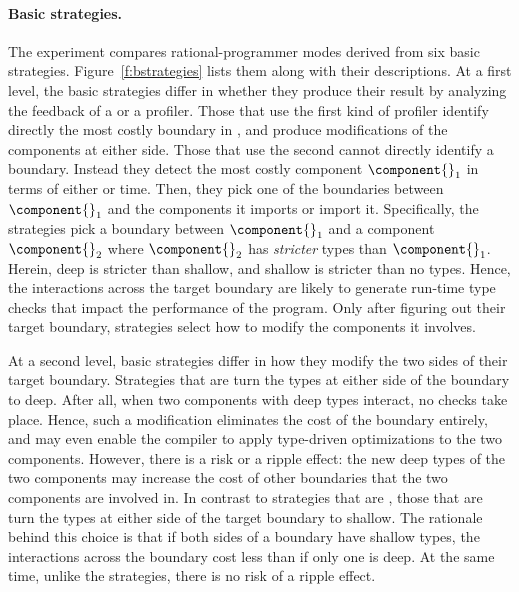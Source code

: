 \paragraph{Basic strategies.}  The experiment compares rational-programmer modes
derived from six basic strategies. Figure~\ref{f:bstrategies} lists them along
with their descriptions.
 At a first level, the basic strategies differ in whether they produce their
 result by analyzing the feedback of a \featkw{} or a \statkw{} profiler.  Those
 that use the first kind of profiler identify directly the most costly boundary
 in \program{}, and produce modifications of the components at either side.
 Those that use the second cannot directly identify a boundary.  Instead they
 detect the most costly component $\component{}_1$ in terms of either \selfkw{}
 or \totalkw{} time.  Then, they pick one of the boundaries between
 $\component{}_1$ and the components it imports or import it.  Specifically, the
 strategies pick a boundary between $\component{}_1$ and a component
 $\component{}_2$ where $\component{}_2$ has \emph{stricter} types than
 $\component{}_1$. Herein, deep is stricter than shallow, and shallow is
 stricter than no types.  Hence, the interactions across the target boundary are
 likely to generate run-time type checks that impact the performance of the
 program.  Only after figuring out their target boundary, \statkw{} strategies
 select how to modify the components it involves.

 At a second level, basic strategies differ in how they modify the two sides of
 their target boundary. Strategies that are \optkw{} turn the types at
 either side of the boundary to deep. After all, when two components with
 deep types interact, no checks take place. Hence, such a modification
 eliminates the cost of the boundary entirely, and may even enable the
 compiler to apply type-driven optimizations to the two components. 
 However, there is a risk or
 a ripple effect: the new deep types of the two components may increase
 the cost of other boundaries that the two components are involved in. In
 contrast to strategies that are \optkw{}, those that are \conkw{} turn
 the types at either side of the target boundary to shallow. The rationale
 behind this choice is that if both sides of a boundary have
 shallow types, the interactions across the boundary cost less than if
 only one is deep. At the same time, unlike the  \optkw{}
 strategies,  there is no risk of a ripple effect. 

